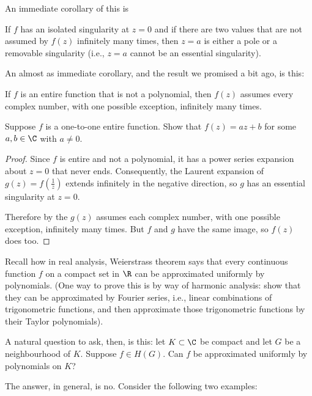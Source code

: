 An immediate corollary of this is

\begin{corollary}\label{cor9.15}
	If $f$ has an isolated singularity at $z = 0$ and if there are two values that are not assumed by $f(z)$ infinitely many times, then $z = a$ is either a pole or a removable singularity (i.e., $z = a$ cannot be an essential singularity).
\end{corollary}

An almost as immediate corollary, and the result we promised a bit ago, is this:

\begin{corollary}\label{cor9.16}
	If $f$ is an entire function that is not a polynomial, then $f(z)$ assumes every complex number, with one possible exception, infinitely many times.
\end{corollary}

\begin{exercise}
	Suppose $f$ is a one-to-one entire function.
	Show that $f(z) = a z + b$ for some $a, b \in \C$ with $a \neq 0$.
\end{exercise}

\begin{proof}
	Since $f$ is entire and not a polynomial, it has a power series expansion about $z = 0$ that never ends.
	Consequently, the Laurent expansion of $g(z) = f(\frac{1}{z})$ extends infinitely in the negative direction, so $g$ has an essential singularity at $z = 0$.

	Therefore by the  $g(z)$ assumes each complex number, with one possible exception, infinitely many times.
	But $f$ and $g$ have the same image, so $f(z)$ does too.
\end{proof}


Recall how in real analysis, Weierstrass theorem says that every continuous function $f$ on a compact set in $\R$ can be approximated uniformly by polynomials.
(One way to prove this is by way of harmonic analysis: show that they can be approximated by Fourier series, i.e., linear combinations of trigonometric functions, and then approximate those trigonometric functions by their Taylor polynomials).

A natural question to ask, then, is this: let $K \subset \C$ be compact and let $G$ be a neighbourhood of $K$.
Suppose $f \in H(G)$.
Can $f$ be approximated uniformly by polynomials on $K$?

The answer, in general, is no.
Consider the following two examples:

